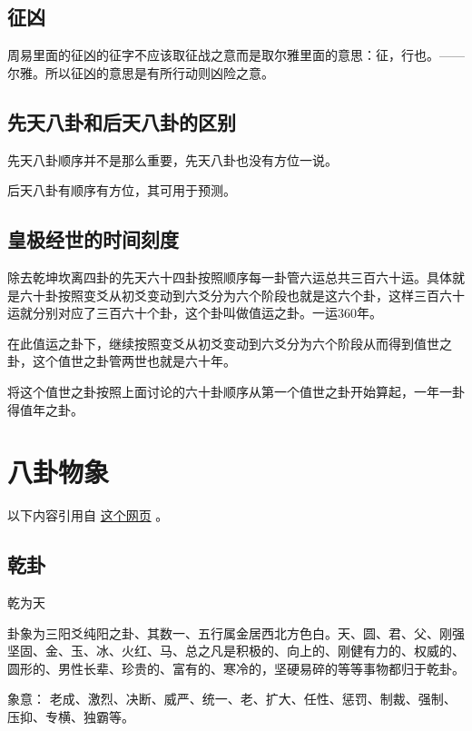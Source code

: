 \documentclass[12pt,oneside]{book}
\begin{document}
\section{征凶}
周易里面的征凶的征字不应该取征战之意而是取尔雅里面的意思：征，行也。——尔雅。所以征凶的意思是有所行动则凶险之意。

\section{先天八卦和后天八卦的区别}
先天八卦顺序并不是那么重要，先天八卦也没有方位一说。

后天八卦有顺序有方位，其可用于预测。


\section{皇极经世的时间刻度}
除去乾坤坎离四卦的先天六十四卦按照顺序每一卦管六运总共三百六十运。具体就是六十卦按照变爻从初爻变动到六爻分为六个阶段也就是这六个卦，这样三百六十运就分别对应了三百六十个卦，这个卦叫做值运之卦。一运360年。

在此值运之卦下，继续按照变爻从初爻变动到六爻分为六个阶段从而得到值世之卦，这个值世之卦管两世也就是六十年。

将这个值世之卦按照上面讨论的六十卦顺序从第一个值世之卦开始算起，一年一卦得值年之卦。

\chapter{八卦物象}
以下内容引用自 \href{https://www.douban.com/note/684840565/}{这个网页} 。

\section{乾卦}
乾为天

卦象为三阳爻纯阳之卦、其数一、五行属金居西北方色白。天、圆、君、父、刚强坚固、金、玉、冰、火红、马、总之凡是积极的、向上的、刚健有力的、权威的、圆形的、男性长辈、珍贵的、富有的、寒冷的，坚硬易碎的等等事物都归于乾卦。

象意： 老成、激烈、决断、威严、统一、老、扩大、任性、惩罚、制裁、强制、压抑、专横、独霸等。
\end{document}

